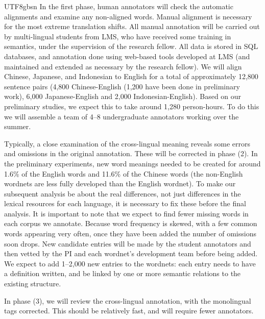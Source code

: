 \documentclass[12pt]{book} %
\begin{document}
\begin{CJK}{UTF8}{gbsn}
In the first phase, human annotators will check the automatic
alignments and examine any non-aligned words.  Manual alignment is
necessary for the most extreme translation shifts.  All manual
annotation will be carried out by multi-lingual students from LMS, who
have received some training in semantics, under the supervision of the
research fellow.  All data is stored in SQL databases, and annotation
done using web-based tools developed at LMS (and maintained and
extended as necessary by the research fellow).  We will align Chinese,
Japanese, and Indonesian to English for a total of approximately 12,800 sentence
pairs (4,800 Chinese-English (1,200 have been done in preliminary
work), 6,000 Japanese-English and 2,000 Indonesian-English).  Based on
our preliminary studies, we expect this to take around 1,280
person-hours.  To do this we will assemble a team of 4--8
undergraduate annotators working over the summer.


Typically, a close examination of the cross-lingual meaning reveals
some errors and omissions in the original annotation.  These will be
corrected in phase (2).  In the preliminary experiments, new word
meanings needed to be created for around 1.6\% of the English words
and 11.6\% of the Chinese words (the non-English wordnets are less
fully developed than the English wordnet).  To make our subsequent
analysis be about the real differences, not just differences in the
lexical resources for each language, it is necessary to fix these
before the final analysis.  It is important to note that we expect to
find fewer missing words in each corpus we annotate. Because word frequency
is skewed, with a few common words appearing very often, once they
have been added the number of omissions soon drops.  New candidate entries
will be made by the student annotators and then vetted by the PI and each
wordnet's development team before being added.  We expect to add
1--2,000 new entries to the wordnets: each entry needs to have a
definition written, and be linked by one or more semantic relations to
the existing structure.


In phase (3), we will review the cross-lingual annotation, with the
monolingual tags corrected.  This should be relatively fast, and will
require fewer annotators.


\end{CJK}
\end{document}
